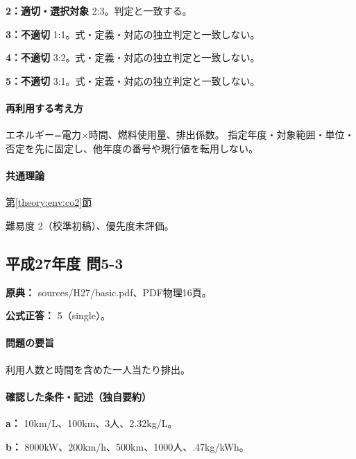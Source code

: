 \noindent\textbf{2：適切・選択対象} 2:3。判定と一致する。\par

\noindent\textbf{3：不適切} 1:1。式・定義・対応の独立判定と一致しない。\par

\noindent\textbf{4：不適切} 3:2。式・定義・対応の独立判定と一致しない。\par

\noindent\textbf{5：不適切} 3:1。式・定義・対応の独立判定と一致しない。\par

\paragraph{再利用する考え方} エネルギー=電力×時間、燃料使用量、排出係数。 指定年度・対象範囲・単位・否定を先に固定し、他年度の番号や現行値を転用しない。

\paragraph{共通理論} \hyperref[theory:env:co2]{第\ref*{theory:env:co2}節}

\par 難易度 2（校準初稿）、優先度未評価。

\subsection{平成27年度 問5-3}
\label{q:h27-reg-basic-5-3}

\noindent\textbf{原典：} sources/H27/basic.pdf、PDF物理16頁。

\textbf{公式正答：} 5（single）。

\paragraph{問題の要旨} 利用人数と時間を含めた一人当たり排出。

\paragraph{確認した条件・記述（独自要約）}\mbox{}\par

\noindent\textbf{a：} 10km/L、100km、3人、2.32kg/L。\par

\noindent\textbf{b：} 8000kW、200km/h、500km、1000人、.47kg/kWh。\par

